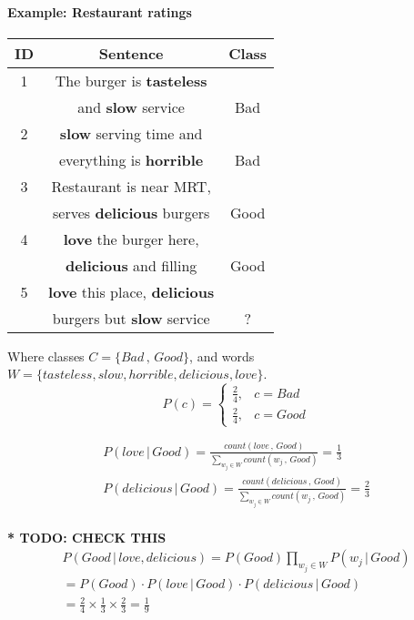 \documentclass[9pt,twocolumn]{article}
\begin{document}
\paragraph*{Example: Restaurant ratings}
\begin{center}
\begin{tabular}{ |c|c|c| } 
\hline
ID & Sentence & Class \\
\hline
1& The burger is \textbf{tasteless} & \\
  & and \textbf{slow} service        & Bad\\
2& \textbf{slow} serving time and & \\
 & everything is \textbf{horrible} & Bad\\
3& Restaurant is near MRT, & \\
 & serves \textbf{delicious} burgers & Good\\
4& \textbf{love} the burger here, & \\
 & \textbf{delicious} and filling & Good\\
\hline
5& \textbf{love} this place, \textbf{delicious} & \\
 & burgers but \textbf{slow} service & ?\\
\hline
\end{tabular}
\end{center}
Where classes $C = \{Bad\,,\,Good\}$, and words $W = \{tasteless, slow, horrible, delicious, love\}$.
\begin{equation}
	P(c) = 
	\begin{cases}
      \frac{2}{4}, & c = Bad \\
      \frac{2}{4}, & c = Good
    \end{cases}
\end{equation}

\begin{equation}
\begin{split}
P(love\,|\,Good) = \frac{count(love\,,\,Good)}{\sum_{w_j\in W}count(w_j\,,\,Good)} = \frac{1}{3}\\
P(delicious\,|\,Good) = \frac{count(delicious\,,\,Good)}{\sum_{w_j\in W}count(w_j\,,\,Good)} = \frac{2}{3}\\
\end{split}
\end{equation}

\textbf{* TODO: CHECK THIS}
\begin{equation}
\begin{split}
P(Good\,|\,{love, delicious}) = P(Good)\prod_{w_j\in W}P(w_j\,|\,Good)\\
= P(Good)\cdot P(love\,|\,Good)\cdot P(delicious\,|\,Good)\\
= \frac{2}{4}\times\frac{1}{3}\times\frac{2}{3} = \frac{1}{9}
\end{split}
\end{equation}
\end{document}
